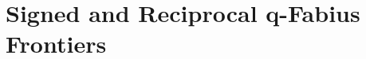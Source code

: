 \documentclass[11pt,oneside]{article}
\numberwithin{equation}{section}
\theoremstyle{definition}
\theoremstyle{remark}
\begin{document}
\newcommand{\Unif}{\operatorname{Unif}}
\newcommand{\Br}{\mathfrak B}
\newcommand{\Zpart}{\mathscr Z}
\newcommand{\Gr}{\operatorname{Gr}}
\setcounter{section}{0}
\renewcommand{\thesection}{\arabic{section}}
\part{Signed and Reciprocal q-Fabius Frontiers}
\end{document}
